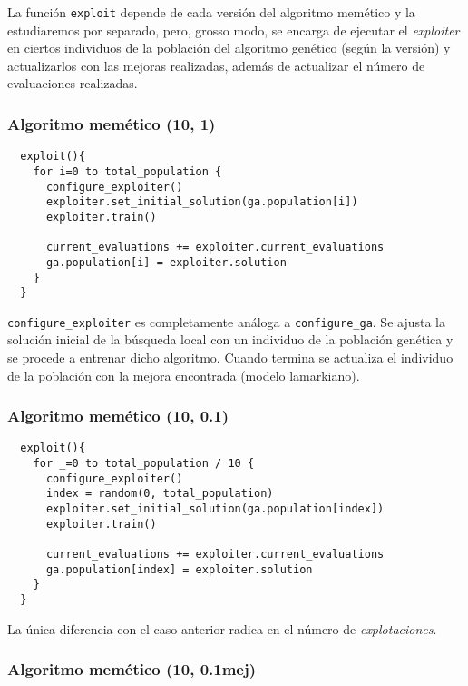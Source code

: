 \documentclass[11pt]{article}
\theoremstyle{plain}
\theoremstyle{definition}
\begin{document}
La función \texttt{exploit} depende de cada versión del algoritmo memético y la estudiaremos por separado, pero, grosso modo, se encarga de ejecutar el \textit{exploiter} en ciertos individuos de la población del algoritmo genético (según la versión) y actualizarlos con las mejoras realizadas, además de actualizar el número de evaluaciones realizadas. \\

\subsubsection{Algoritmo memético (10, 1)}

\begin{lstlisting}
  exploit(){
    for i=0 to total_population {
      configure_exploiter()
      exploiter.set_initial_solution(ga.population[i])
      exploiter.train()

      current_evaluations += exploiter.current_evaluations
      ga.population[i] = exploiter.solution
    }
  }
\end{lstlisting}

\texttt{configure\_exploiter} es completamente análoga a \texttt{configure\_ga}. Se ajusta la solución inicial de la búsqueda local con un individuo de la población genética y se procede a entrenar dicho algoritmo. Cuando termina se actualiza el individuo de la población con la mejora encontrada (modelo lamarkiano). \\

\subsubsection{Algoritmo memético (10, 0.1)}

\begin{lstlisting}
  exploit(){
    for _=0 to total_population / 10 {
      configure_exploiter()
      index = random(0, total_population)
      exploiter.set_initial_solution(ga.population[index])
      exploiter.train()

      current_evaluations += exploiter.current_evaluations
      ga.population[index] = exploiter.solution
    }
  }
\end{lstlisting}

La única diferencia con el caso anterior radica en el número de \textit{explotaciones}. \\

\subsubsection{Algoritmo memético (10, 0.1mej)}
\end{document}
